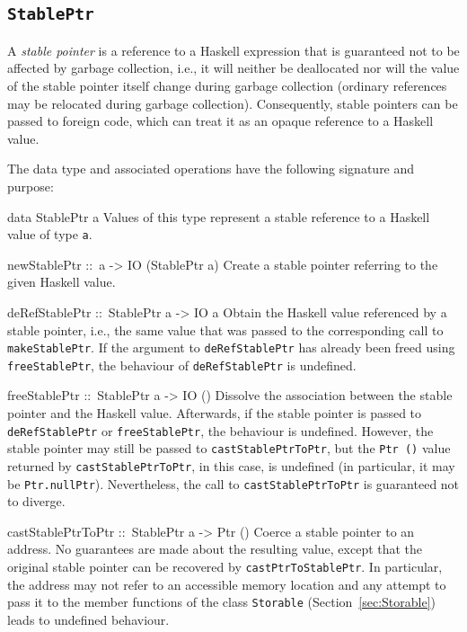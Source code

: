 \documentclass[a4paper,twoside]{article}
\makeatletter
\newcommand{\code}[1]{\texttt{#1}}      %
\newenvironment{codedesc}{%
  \list{}{\labelwidth\z@
    \let\makelabel\codedesclabel}
  }{%
  \endlist
  }
\newcommand*{\codedesclabel}[1]{%
  \hspace{-\leftmargin}
  \parbox[b]{\labelwidth}{\makebox[0pt][l]{\code{#1}}\\}\hfil\relax
  }
\makeatother
\begin{document}
\subsection{\code{StablePtr}}
\label{sec:StablePtr}

A \emph{stable pointer} is a reference to a Haskell expression that is
guaranteed not to be affected by garbage collection, i.e., it will neither be
deallocated nor will the value of the stable pointer itself change during
garbage collection (ordinary references may be relocated during garbage
collection).  Consequently, stable pointers can be passed to foreign code,
which can treat it as an opaque reference to a Haskell value.

The data type and associated operations have the following signature and
purpose:
%
\begin{codedesc}
\item[data StablePtr a] Values of this type represent a stable reference to a
  Haskell value of type \code{a}.
  
\item[newStablePtr ::\ a -> IO (StablePtr a)] Create a stable pointer
  referring to the given Haskell value.
  
\item[deRefStablePtr ::\ StablePtr a -> IO a] Obtain the Haskell value
  referenced by a stable pointer, i.e., the same value that was passed to the
  corresponding call to \code{makeStablePtr}.  If the argument to
  \code{deRefStablePtr} has already been freed using \code{freeStablePtr}, the
  behaviour of \code{deRefStablePtr} is undefined.
  
\item[freeStablePtr ::\ StablePtr a -> IO ()] Dissolve the association between
  the stable pointer and the Haskell value. Afterwards, if the stable pointer
  is passed to \code{deRefStablePtr} or \code{freeStablePtr}, the behaviour is
  undefined.  However, the stable pointer may still be passed to
  \code{castStablePtrToPtr}, but the \code{Ptr ()} value returned by
  \code{castStablePtrToPtr}, in this case, is undefined (in particular, it may
  be \code{Ptr.nullPtr}).  Nevertheless, the call to \code{castStablePtrToPtr}
  is guaranteed not to diverge.
  
\item[castStablePtrToPtr ::\ StablePtr a -> Ptr ()] Coerce a stable pointer to
  an address. No guarantees are made about the resulting value, except that
  the original stable pointer can be recovered by \code{castPtrToStablePtr}.
  In particular, the address may not refer to an accessible memory location and
  any attempt to pass it to the member functions of the class \code{Storable}
  (Section~\ref{sec:Storable}) leads to undefined behaviour.
  

\end{codedesc}
\end{document}
